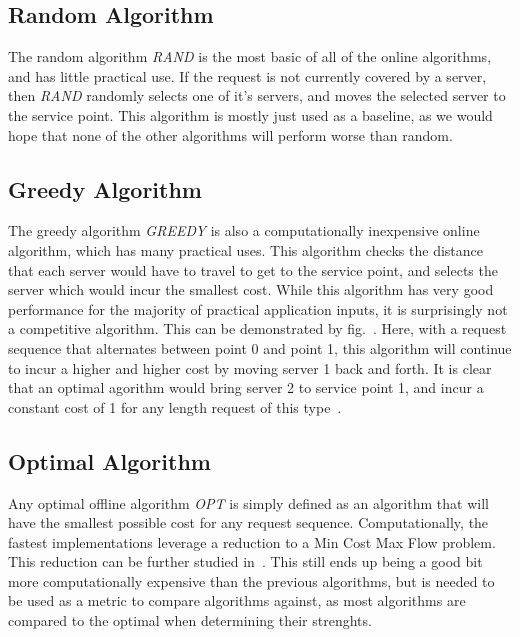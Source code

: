 
\subsection*{Random Algorithm}
\label{sec:rand}
The random algorithm \textit{RAND} is the most basic of all of the online algorithms, and has little practical use. If the request is not currently covered by a server, then \textit{RAND} randomly selects one of it's servers, and moves the selected server to the service point. This algorithm is mostly just used as a baseline, as we would hope that none of the other algorithms will perform worse than random.

\subsection*{Greedy Algorithm}
\label{sec:greedy}
The greedy algorithm \textit{GREEDY} is also a computationally inexpensive online algorithm, which has many practical uses. This algorithm checks the distance that each server would have to travel to get to the service point, and selects the server which would incur the smallest cost. While this algorithm has very good performance for the majority of practical application inputs, it is surprisingly not a competitive algorithm. This can be demonstrated by fig.~. Here, with a request sequence that alternates between point 0 and point 1, this algorithm will continue to incur a higher and higher cost by moving server 1 back and forth. It is clear that an optimal agorithm would bring server 2 to service point 1, and incur a constant cost of 1 for any length request of this type~\cite{OnlineComp1998}.

\subsection*{Optimal Algorithm}
\label{sec:OPT}
Any optimal offline algorithm \textit{OPT} is simply defined as an algorithm that will have the smallest possible cost for any request sequence. Computationally, the fastest implementations leverage a reduction to a Min Cost Max Flow problem. This reduction can be further studied in~\cite{WFA2009}. This still ends up being a good bit more computationally expensive than the previous algorithms, but is needed to be used as a metric to compare algorithms against, as most algorithms are compared to the optimal when determining their strenghts.

